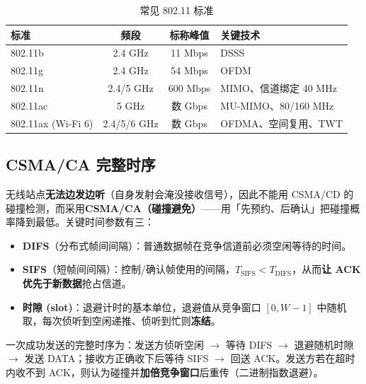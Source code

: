 \begin{table}[H]
\centering
\caption{常见 802.11 标准}
\renewcommand{\arraystretch}{1.35}
\begin{tabulary}{\textwidth}{@{}lCCL@{}}
\toprule
\textbf{标准} & \textbf{频段} & \textbf{标称峰值} & \textbf{关键技术} \\
\midrule
802.11b & 2.4 GHz & 11 Mbps & DSSS \\
802.11g & 2.4 GHz & 54 Mbps & OFDM \\
802.11n & 2.4/5 GHz & 600 Mbps & MIMO、信道绑定 40 MHz \\
802.11ac & 5 GHz & 数 Gbps & MU-MIMO、80/160 MHz \\
802.11ax (Wi-Fi 6) & 2.4/5/6 GHz & 数 Gbps & OFDMA、空间复用、TWT \\
\bottomrule
\end{tabulary}
\end{table}

\subsection{CSMA/CA 完整时序}

无线站点\textbf{无法边发边听}（自身发射会淹没接收信号），因此不能用 CSMA/CD 的碰撞检测，而采用\textbf{CSMA/CA（碰撞避免）}——用「先预约、后确认」把碰撞概率降到最低。关键时间参数有三：

\begin{itemize}
    \item \textbf{DIFS}（分布式帧间间隔）：普通数据帧在竞争信道前必须空闲等待的时间。
    \item \textbf{SIFS}（短帧间间隔）：控制/确认帧使用的间隔，$T_{\text{SIFS}}<T_{\text{DIFS}}$，从而\textbf{让 ACK 优先于新数据}抢占信道。
    \item \textbf{时隙 (slot)}：退避计时的基本单位，退避值从竞争窗口 $[0,W-1]$ 中随机取，每次侦听到空闲递推、侦听到忙则\textbf{冻结}。
\end{itemize}

一次成功发送的完整时序为：发送方侦听空闲 $\to$ 等待 DIFS $\to$ 退避随机时隙 $\to$ 发送 DATA；接收方正确收下后等待 SIFS $\to$ 回送 ACK。发送方若在超时内收不到 ACK，则认为碰撞并\textbf{加倍竞争窗口}后重传（二进制指数退避）。

